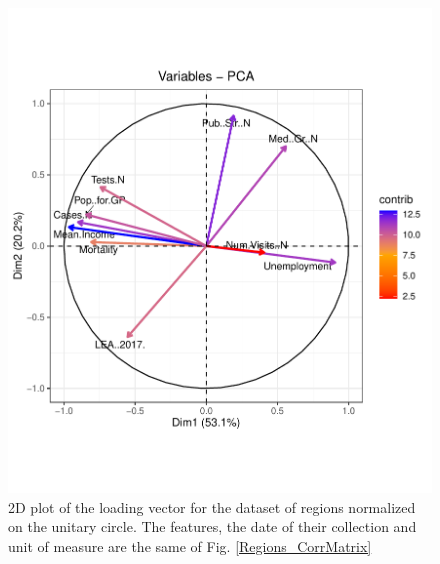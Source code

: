 \documentclass[
12pt, %
a4paper, %
oneside, %
headinclude,footinclude, %
BCOR5mm, %
]{scrartcl}
\begin{document}
\begin{figure}[h]
\begin{center}
\includegraphics[scale=1]{Pic/Regioni_PCA_loadings.pdf}
\caption{2D plot of the loading vector for the dataset of regions normalized on the unitary circle. The features, the date of their collection and unit of measure are the same of Fig. \ref{Regions_CorrMatrix}}
\label{Regioni_PCA_loadings}
\end{center}
\end{figure}
\end{document}
